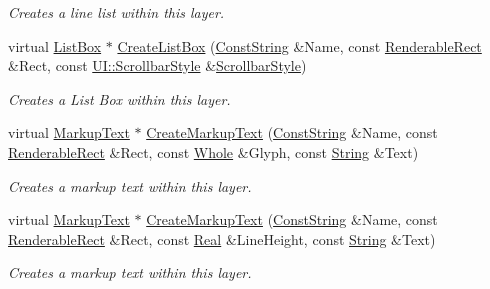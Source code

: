 \begin{DoxyCompactItemize}
\begin{DoxyCompactList}\small\item\em Creates a line list within this layer. \item\end{DoxyCompactList}\item 
virtual \hyperlink{classMezzanine_1_1UI_1_1ListBox}{ListBox} $\ast$ \hyperlink{classMezzanine_1_1UI_1_1Layer_a56fcefd3f12d19293ea23303c642c1b7}{CreateListBox} (\hyperlink{namespaceMezzanine_a63cd699ac54b73953f35ec9cfc05e506}{ConstString} \&Name, const \hyperlink{structMezzanine_1_1UI_1_1RenderableRect}{RenderableRect} \&Rect, const \hyperlink{namespaceMezzanine_1_1UI_a5998a9bf372a7e92605c0c461736e763}{UI::ScrollbarStyle} \&\hyperlink{namespaceMezzanine_1_1UI_a5998a9bf372a7e92605c0c461736e763}{ScrollbarStyle})
\begin{DoxyCompactList}\small\item\em Creates a List Box within this layer. \item\end{DoxyCompactList}\item 
virtual \hyperlink{classMezzanine_1_1UI_1_1MarkupText}{MarkupText} $\ast$ \hyperlink{classMezzanine_1_1UI_1_1Layer_a0206ad6de1e6510cd04fbab9a468df8d}{CreateMarkupText} (\hyperlink{namespaceMezzanine_a63cd699ac54b73953f35ec9cfc05e506}{ConstString} \&Name, const \hyperlink{structMezzanine_1_1UI_1_1RenderableRect}{RenderableRect} \&Rect, const \hyperlink{namespaceMezzanine_adcbb6ce6d1eb4379d109e51171e2e493}{Whole} \&Glyph, const \hyperlink{namespaceMezzanine_acf9fcc130e6ebf08e3d8491aebcf1c86}{String} \&Text)
\begin{DoxyCompactList}\small\item\em Creates a markup text within this layer. \item\end{DoxyCompactList}\item 
virtual \hyperlink{classMezzanine_1_1UI_1_1MarkupText}{MarkupText} $\ast$ \hyperlink{classMezzanine_1_1UI_1_1Layer_a32aee6b1ea0d7550b096a0c4e4bb42db}{CreateMarkupText} (\hyperlink{namespaceMezzanine_a63cd699ac54b73953f35ec9cfc05e506}{ConstString} \&Name, const \hyperlink{structMezzanine_1_1UI_1_1RenderableRect}{RenderableRect} \&Rect, const \hyperlink{namespaceMezzanine_a726731b1a7df72bf3583e4a97282c6f6}{Real} \&LineHeight, const \hyperlink{namespaceMezzanine_acf9fcc130e6ebf08e3d8491aebcf1c86}{String} \&Text)
\begin{DoxyCompactList}\small\item\em Creates a markup text within this layer. \item\end{DoxyCompactList}\item 

\end{DoxyCompactItemize}
